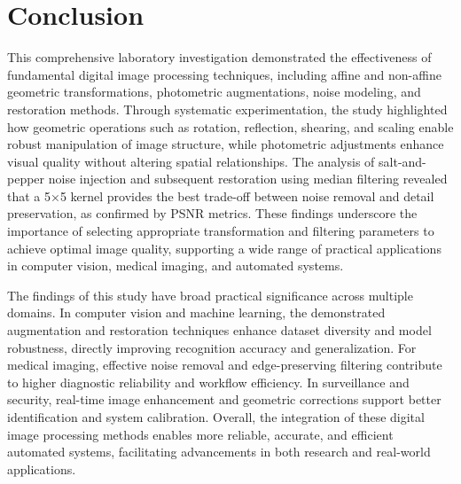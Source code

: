 \documentclass[a4paper, journal]{IEEEtran}
\begin{document}
\section{Conclusion}
This comprehensive laboratory investigation demonstrated the effectiveness of fundamental digital image processing techniques, including affine and non-affine geometric transformations, photometric augmentations, noise modeling, and restoration methods. Through systematic experimentation, the study highlighted how geometric operations such as rotation, reflection, shearing, and scaling enable robust manipulation of image structure, while photometric adjustments enhance visual quality without altering spatial relationships. The analysis of salt-and-pepper noise injection and subsequent restoration using median filtering revealed that a 5×5 kernel provides the best trade-off between noise removal and detail preservation, as confirmed by PSNR metrics. These findings underscore the importance of selecting appropriate transformation and filtering parameters to achieve optimal image quality, supporting a wide range of practical applications in computer vision, medical imaging, and automated systems.

The findings of this study have broad practical significance across multiple domains. In computer vision and machine learning, the demonstrated augmentation and restoration techniques enhance dataset diversity and model robustness, directly improving recognition accuracy and generalization. For medical imaging, effective noise removal and edge-preserving filtering contribute to higher diagnostic reliability and workflow efficiency. In surveillance and security, real-time image enhancement and geometric corrections support better identification and system calibration. Overall, the integration of these digital image processing methods enables more reliable, accurate, and efficient automated systems, facilitating advancements in both research and real-world applications.



\end{document}
